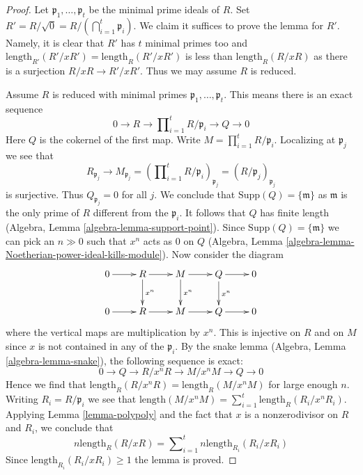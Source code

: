 \documentclass[10pt,a4paper]{amsart}
\theoremstyle{plain}
\theoremstyle{definition}
\theoremstyle{remark}
\numberwithin{equation}{subsection}
\begin{document}
\begin{proof}
Let $\mathfrak p_1, \ldots, \mathfrak p_t$ be the minimal prime ideals
of $R$. Set $R' = R/\sqrt{0} = R/(\bigcap_{i = 1}^t \mathfrak p_i)$.
We claim it suffices to prove the lemma for $R'$. Namely, it is clear
that $R'$ has $t$ minimal primes
too and $\text{length}_{R'}(R'/xR') = \text{length}_R(R'/xR')$
is less than $\text{length}_R(R/xR)$ as there is a surjection
$R/xR \to R'/xR'$. Thus we may assume $R$ is reduced.

\medskip\noindent
Assume $R$ is reduced with minimal primes
$\mathfrak p_1, \ldots, \mathfrak p_t$.
This means there is an exact sequence
$$
0 \to R \to
\prod\nolimits_{i = 1}^t R/\mathfrak p_i \to Q \to 0
$$
Here $Q$ is the cokernel of the first map.
Write $M = \prod_{i = 1}^t R/\mathfrak p_i$.
Localizing at $\mathfrak p_j$ we see that
$$
R_{\mathfrak p_j} \to M_{\mathfrak p_j} =
\left(\prod\nolimits_{i=1}^t R/\mathfrak p_i\right)_{\mathfrak p_j} =
(R/\mathfrak p_j)_{\mathfrak p_j}
$$
is surjective. Thus $Q_{\mathfrak p_j} = 0$ for all $j$.
We conclude that $\text{Supp}(Q) = \{\mathfrak m\}$ as $\mathfrak m$
is the only prime of $R$ different from the $\mathfrak p_i$.
It follows that $Q$ has finite length
(Algebra, Lemma \ref{algebra-lemma-support-point}).
Since $\text{Supp}(Q) = \{\mathfrak m\}$ we
can pick an $n \gg 0$ such that $x^n$
acts as $0$ on $Q$
(Algebra, Lemma \ref{algebra-lemma-Noetherian-power-ideal-kills-module}).
Now consider the diagram
$$
\xymatrix{
0 \ar[r] & R \ar[r] \ar[d]^-{x^n} & M
\ar[r] \ar[d]^-{x^n} & Q \ar[r] \ar[d]^-{x^n} & 0 \\
0 \ar[r] & R \ar[r] & M \ar[r] & Q \ar[r] & 0
}
$$
where the vertical maps are multiplication by $x^n$. This is injective on
$R$ and on $M$ since $x$ is not contained in any of the $\mathfrak p_i$.
By the snake lemma (Algebra, Lemma \ref{algebra-lemma-snake}),
the following sequence is exact:
$$
0 \to Q \to R/x^nR \to M/x^nM \to Q \to 0
$$
Hence we find that $\text{length}_R(R/x^nR) = \text{length}_R(M/x^nM)$
for large enough $n$. Writing $R_i = R/\mathfrak p_i$ we see
that $\text{length}(M/x^nM) =
\sum_{i = 1}^t \text{length}_R(R_i/x^nR_i)$.
Applying Lemma \ref{lemma-polypoly} and the fact that $x$ is a nonzerodivisor
on $R$ and $R_i$, we conclude that
$$
n \text{length}_R(R/xR) =
\sum\nolimits_{i = 1}^t n \text{length}_{R_i}(R_i/x R_i)
$$
Since $\text{length}_{R_i}(R_i/x R_i) \geq 1$ the lemma is proved.
\end{proof}
\end{document}
